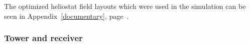 The optimized heliostat field layouts which were used in the simulation can be seen in Appendix~\ref{documentary}, page~\pageref{SM}.

\subsubsection{Tower and receiver}

